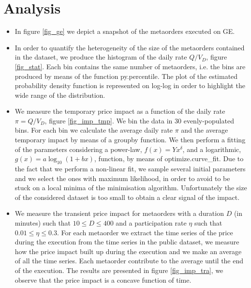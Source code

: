 \documentclass[12pt]{article}
\begin{document}
\section{Analysis}

\begin{itemize}
\item In figure \ref{fig_ge} we depict a snapshot of the metaorders executed on GE.

\item In order to quantify the heterogeneity of the size of the metaorders contained in the dataset, we produce the histogram of the daily rate $Q/V_D$, figure \ref{fig_stat}. Each bin contains the same number of metaorders, i.e. the bins are produced by means of the function \textsf{py.percentile}. The plot of the estimated probability density function is represented on log-log in order to highlight the wide range of the distribution.

\item We measure the temporary price impact as a function of the daily rate $\pi = Q/V_D$, figure \ref{fig_imp_tmp}. We bin the data in 30 evenly-populated bins. For each bin we calculate the average daily rate $\pi$ and the average temporary impact by means of a \textsf{groupby} function. We then perform a fitting of the parameters considering a power-law, $f(x)= Yx^{\delta}$, and a logarithmic, $g(x) = a \log_{10}(1+bx)$,  function, by means of \textsf{optimize.curve\_fit}. Due to the fact that we perform a non-linear fit, we sample several initial parameters and we select the ones with maximum likelihood, in order to avoid to be stuck on a local minima of the minimisation algorithm. Unfortunately the size of the considered dataset is too small to obtain a clear signal of the impact.

\item We measure the transient price impact for metaorders with a duration $D$ (in minutes) such that $10 \le D \le 400$ and a participation rate $\eta$ such that $0.01 \le \eta \le 0.3$. For each metaorder we extract the time series of the price during the execution from the time series in the public dataset, we measure how the price impact built up during the execution and we make an average of all the time series. Each metaorder contribute to the average until the end of the execution. The results are presented in figure \ref{fig_imp_tra}, we observe that the price impact is a concave function of time. 

\end{itemize}
\end{document}
